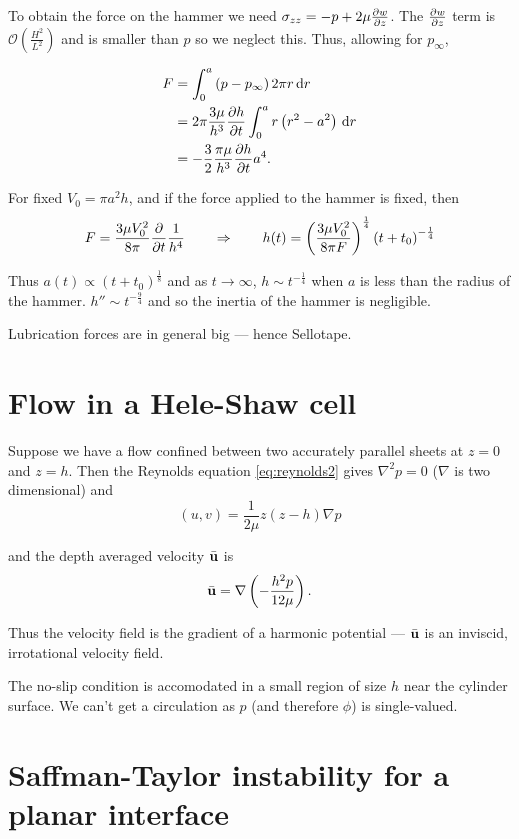 \documentclass{notes}
\newcommand{\cO}{\mathcal{O}}
\theoremstyle{plain}
\begin{document}
To obtain the force on the hammer we need $\sigma_{zz} = -p
+ 2 \mu \frac{\partial w}{\partial z}$.  The $\frac{\partial w}{\partial z}$ term is $\cO(\tfrac{H^2}{L^2})$ 
and is smaller than $p$ so we neglect this.  Thus, allowing for
$p_\infty$,

\begin{align*}
F &= \int_0^a \left( p - p_\infty \right) 2 \pi r \, \mathrm{d} r \\
&=2 \pi \frac{3 \mu}{h^3} \frac{\partial h}{\partial t} \int_0^a r \left(r^2 - a^2 \right)\,
\mathrm{d} r\\
&= - \frac{3}{2} \frac{\pi \mu}{h^3} \frac{\partial h}{\partial t} a^4.
\end{align*}

For fixed $V_0 = \pi a^2 h$, and if the force applied
to the hammer is fixed, then
\[
F = \frac{3 \mu V_0^2}{8 \pi} \frac{\partial }{\partial t} \frac{1}{h^4} \qquad \Rightarrow
\qquad
h(t) = \left( \frac{3 \mu V_0^2}{8 \pi F}
\right)^{\frac{1}{4}} \left( t + t_0 \right)^{-\frac{1}{4}}
\]

Thus $a(t) \propto \left( t+t_0 \right)^{\frac{1}{8}}$ and as
$t \to \infty$, $h \sim t^{-\frac{1}{4}}$ when $a$ is less than the
radius of the hammer.  $h'' \sim t^{-\frac{9}{4}}$ and so the inertia
of the hammer is negligible.

Lubrication forces are in general big --- hence Sellotape.

\section{Flow in a Hele-Shaw cell}

Suppose we have a flow confined between two accurately parallel
sheets at $z = 0$ and $z=h$.  Then the Reynolds equation \eqref{eq:reynolds2}
gives $\nabla^2 p = 0$ ($\nabla$ is two dimensional) and
\[
(u,v) = \frac{1}{2 \mu} z \left( z - h \right) \nabla p
\]

and the depth averaged velocity $\Bar{\mathbf{u}}$ is
\[
\Bar{\mathbf{u}} = \nabla \left( -\frac{h^2 p}{12 \mu} \right).
\]

Thus the velocity field is the gradient of a harmonic potential ---
$\Bar{\mathbf{u}}$ is an inviscid, irrotational velocity field.

The no-slip condition is accomodated in a small region of size $h$ near
the cylinder surface.  We can't get a circulation as $p$ (and therefore
$\phi$) is single-valued.

\section[Saffman-Taylor instability]%
{Saffman-Taylor instability for a planar interface}
\end{document}

